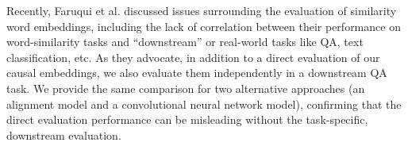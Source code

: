 Recently, Faruqui et al.\citeyear{faruqui2016problems} discussed issues surrounding the evaluation of similarity word embeddings, including the lack of correlation between their performance on word-similarity tasks and ``downstream'' or real-world tasks like QA, text classification, etc.  As they advocate, in addition to a direct evaluation of our causal embeddings, we also evaluate them independently in a downstream QA task.  We provide the same comparison for two alternative approaches (an alignment model and a convolutional neural network model), confirming that the direct evaluation performance can be misleading without the task-specific, downstream evaluation. 